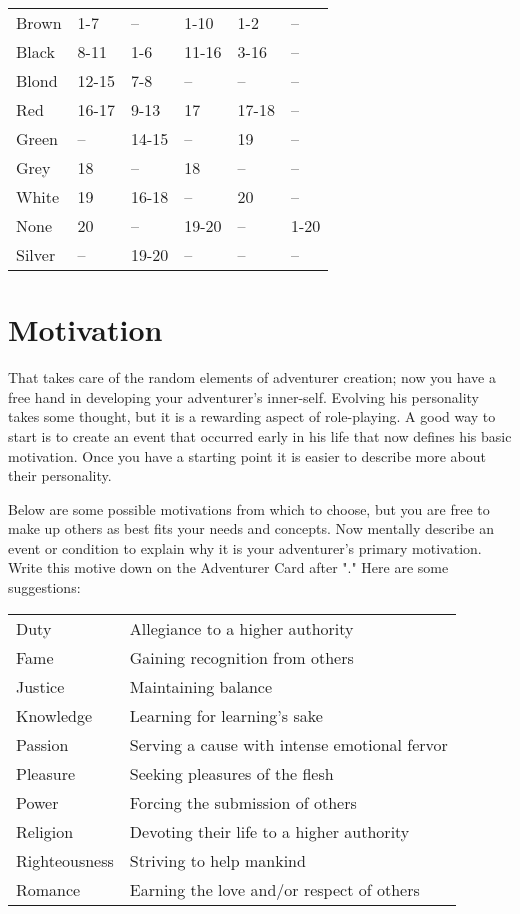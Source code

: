 \begin{multicols*}{2}
\begin{normboxc}
\begin{tabular}{@{}l l l l l l}
Brown & 1-7 & -- & 1-10 & 1-2 & --\\
Black & 8-11 & 1-6 & 11-16 & 3-16 & --\\
Blond & 12-15 & 7-8 & -- & -- & --\\
Red & 16-17 & 9-13 & 17 & 17-18 & --\\
Green & -- & 14-15 & -- & 19 & --\\
Grey & 18 & -- & 18 & -- & --\\
White & 19 & 16-18 & -- & 20 & --\\
None & 20 & -- & 19-20 & -- & 1-20\\
Silver & -- & 19-20 & -- & -- & --
\end{tabular}
\end{normboxc}
\section{Motivation}
That takes care of the random elements of adventurer creation; now you have a free hand in developing your adventurer's inner-self. Evolving his personality takes some thought, but it is a rewarding aspect of role-playing. A good way to start is to create an event that occurred early in his life that now defines his basic motivation. Once you have a starting point it is easier to describe more about their personality.

Below are some possible motivations from which to choose, but you are free to make up others as best fits your needs and concepts. Now mentally describe an event or condition to explain why it is your adventurer's primary motivation. Write this motive down on the Adventurer Card after "." Here are some suggestions:
\begin{normboxc}[Motivation]
\small
\begin{tabularx}{\linewidth}{@{} l L}
Duty & Allegiance to a higher authority\\
Fame & Gaining recognition from others\\
Justice & Maintaining balance\\
Knowledge & Learning for learning's sake\\
Passion & Serving a cause with intense emotional fervor\\
Pleasure & Seeking pleasures of the flesh\\
Power & Forcing the submission of others\\
Religion & Devoting their life to a higher authority\\
Righteousness & Striving to help mankind\\
Romance & Earning the love and/or respect of others
\end{tabularx}
\end{normboxc}


\end{multicols*}
